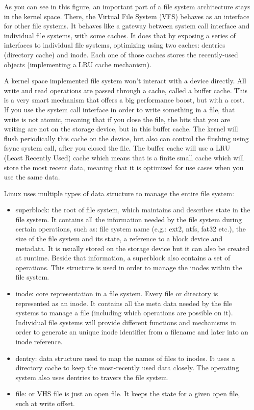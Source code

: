         As you can see in this figure, an important part of a file system architecture stays in the kernel space. There, the Virtual File System (VFS) behaves as an interface for other file systems. It behaves like a gateway between system call interface and individual file systems, with some caches. It does that by exposing a series of interfaces to individual file systems, optimizing using two caches: dentries (directory cache) and inode. Each one of those caches stores the recently-used objects (implementing a LRU cache mechanism).
        
        A kernel space implemented file system won't interact with a device directly. All write and read operations are passed through a cache, called a buffer cache. This is a very smart mechanism that offers a big performance boost, but with a cost. If you use the system call interface in order to write something in a file, that write is not atomic, meaning that if you close the file, the bits that you are writing are not on the storage device, but in this buffer cache. The kernel will flush periodically this cache on the device, but also can control the flushing using fsync system call, after you closed the file. The buffer cache will use a LRU (Least Recently Used) cache which means that is a finite small cache which will store the most recent data, meaning that it is optimized for use cases when you use the same data. 
        
        Linux uses multiple types of data structure to manage the entire file system:
        \begin{itemize}
            \item superblock: the root of file system, which maintains and describes state in the file system. It contains all the information needed by the file system during certain operations, such as: file system name (e.g.: ext2, ntfs, fat32 etc.), the size of the file system and its state, a reference to a block device and metadata. It is usually stored on the storage device but it can also be created at runtime. Beside that information, a superblock also contains a set of operations. This structure is used in order to manage the inodes within the file system.
            \item inode: core representation in a file system. Every file or directory is represented as an inode.
            It contains all the meta data needed by the file systems to manage a file (including which operations are possible on it). Individual file systems will provide different functions and mechanisms in order to generate an unique inode identifier from a filename and later into an inode reference.
            \item dentry: data structure used to map the names of files to inodes. It uses a directory cache to keep the most-recently used data closely. The operating system also uses dentries to travers the file system.
            \item file: or VHS file is just an open file. It keeps the state for a given open file, such at write offset.
        \end{itemize}

